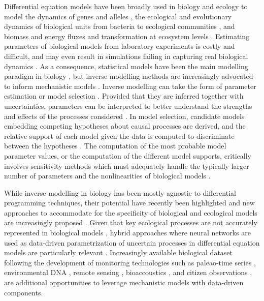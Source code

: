 Differential equation models have been broadly used in biology and ecology to model the dynamics of genes and alleles \cite{Page2002}, the ecological and evolutionary dynamics of biological units from bacteria to ecological communities \cite{Gabor2015,Lion2018,Villa2021,Boussange2022,boussange2023a, Akesson2021,chalmandrier2021,VandenBerg2022}, and biomass and energy fluxes and transformation at ecosystem levels \cite{Weng2015,Schartau2017,Franklin2020,Geary2020}.
Estimating parameters of biological models from laboratory experiments is costly and difficult\cite{Schartau2017}, and may even result in simulations failing in capturing real biological dynamics \cite{Watts2001}. 
As a consequence, statistical models have been the main modelling paradigm in biology \cite{zimmermann2010}, but inverse modelling methods are increasingly advocated to inform mechanistic models \cite{hartig2012,alsos2023,pantel2023}.
Inverse modelling can take the form of parameter estimation \cite{Schartau2017} or model selection \cite{Johnson2004}.
Provided that they are inferred together with uncertainties, parameters can be interpreted to better understand the strengths and effects of the processes considered \cite{Pontarp2019,Higgins2010,Curtsdotter2019,godwin2020}.
In model selection, candidate models embedding competing hypotheses about causal processes are derived, and the relative support of each model given the data is computed to discriminate between the hypotheses \cite{Johnson2004,alsos2023}.
The computation of the most probable model parameter values, or the computation of the different model supports, critically involves sensitivity methods which must adequately handle the typically larger number of parameters and the nonlinearities of biological models \cite{Gabor2015}.

While inverse modelling in biology has been mostly agnostic to differential programming techniques, their potential have recently been highlighted \cite{frank2022,alsos2023} and new approaches to accommodate for the specificity of biological and ecological models are increasingly proposed \cite{Yazdani2020,Boussange2024,paredes2023}. 
Given that key ecological processes are not accurately represented in biological models \cite{hartig2012,Schartau2017,chalmandrier2021}, hybrid approaches where neural networks are used as data-driven parametrization of uncertain processes in differential equation models are particularly relevant \cite{rasp2018,Boussange2024}.
Increasingly available biological dataset following the development of monitoring technologies such as paleao-time series \cite{alsos2023}, environmental DNA \cite{Ruppert2019}, remote sensing \cite{Jetz2019}, bioaccoustics \cite{Aide2013}, and citizen observations \cite{GBIF}, are additional opportunities to leverage mechanistic models with data-driven components.

